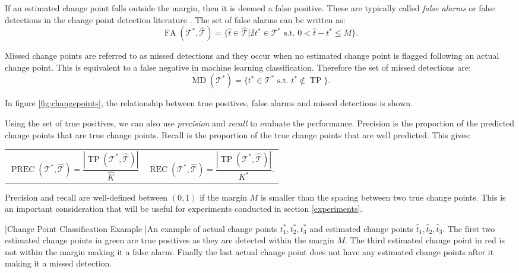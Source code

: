 If an estimated change point falls outside the margin, then it is deemed a false positive. These are typically called \textit{false alarms} or false detections in the change point detection literature \cite{lee2010change}. The set of false alarms can be written as:
\begin{equation}
\operatorname{FA}(\mathcal{T}^*, \hat{\mathcal{T}}) = \{\hat{t} \in  \hat{\mathcal{T}} | \nexists t^* \in \mathcal{T}^* \text{ s.t. } 0 < \hat{t} - t^* \leq M\}.
\end{equation}

Missed change points are referred to as missed detections and they occur when no estimated change point is flagged following an actual change point. This is equivalent to a false negative in machine learning classification. Therefore the set of missed detections are:
\begin{equation}
\operatorname{MD}(\mathcal{T}^*) = \{t^* \in \mathcal{T}^*  \text{ s.t. } t^* \notin \operatorname{TP} \}.
\end{equation}

In figure \ref{fig:changepoints}, the relationship between true positives, false alarms and missed detections is shown.

Using the set of true positives, we can also use \textit{precision} and \textit{recall} to evaluate the performance. Precision is the proportion of the predicted change points that are true change points. Recall is the proportion of the true change points that are well predicted. This gives:

\noindent
\begin{tabularx}{\linewidth}{@{}XX@{}}
\begin{equation}
\operatorname{PREC}(\mathcal{T}^{*}, \hat{\mathcal{T}})=\frac{|\operatorname{TP}(\mathcal{T}^{*}, \hat{\mathcal{T}})|} {\hat{K}}
\end{equation}
&
\begin{equation}
\operatorname{REC}(\mathcal{T}^{*}, \hat{\mathcal{T}})=\frac{|\operatorname{TP}(\mathcal{T}^{*}, \hat{\mathcal{T}})|} {K^*}.
\end{equation}
\end{tabularx}
Precision and recall are well-defined between $(0,1)$ if the margin $M$ is smaller than the spacing between two true change points. This is an important consideration that will be useful for experiments conducted in section \ref{experiments}.

\begin{center} 
[Change Point Classification Example ]{An example of actual change points $t_1^*, t_2^*, t_3^*$ and estimated change points ${\hat{t}_1, \hat{t}_2, \hat{t}_3}$. The first two estimated change points in green are true positives as they are detected within the margin $M$.  The third estimated change point in red is not within the margin making it a false alarm. Finally the last actual change point does not have any estimated change points after it making it a missed detection.} 
\label{fig:changepoints} 
\end{center}

